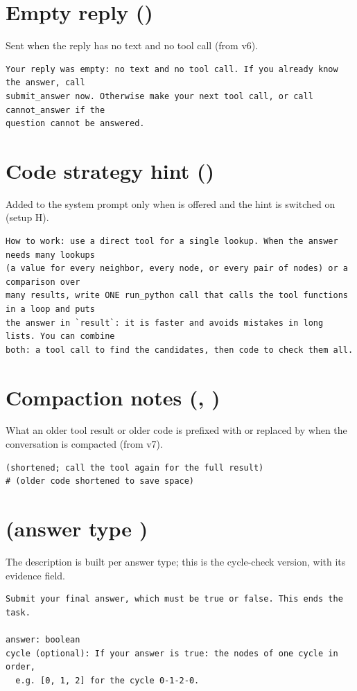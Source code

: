\section*{Empty reply ()}
Sent when the reply has no text and no tool call (from v6).
\begin{lstlisting}
Your reply was empty: no text and no tool call. If you already know the answer, call
submit_answer now. Otherwise make your next tool call, or call cannot_answer if the
question cannot be answered.
\end{lstlisting}

\section*{Code strategy hint ()}
Added to the system prompt only when  is offered and the hint is switched on (setup H).
\begin{lstlisting}
How to work: use a direct tool for a single lookup. When the answer needs many lookups
(a value for every neighbor, every node, or every pair of nodes) or a comparison over
many results, write ONE run_python call that calls the tool functions in a loop and puts
the answer in `result`: it is faster and avoids mistakes in long lists. You can combine
both: a tool call to find the candidates, then code to check them all.
\end{lstlisting}

\section*{Compaction notes (, )}
What an older tool result or older code is prefixed with or replaced by when the conversation is compacted (from v7).
\begin{lstlisting}
(shortened; call the tool again for the full result)
# (older code shortened to save space)
\end{lstlisting}

\section*{ (answer type )}
The description is built per answer type; this is the cycle-check version, with its evidence field.
\begin{lstlisting}
Submit your final answer, which must be true or false. This ends the task.

answer: boolean
cycle (optional): If your answer is true: the nodes of one cycle in order,
  e.g. [0, 1, 2] for the cycle 0-1-2-0.
\end{lstlisting}

